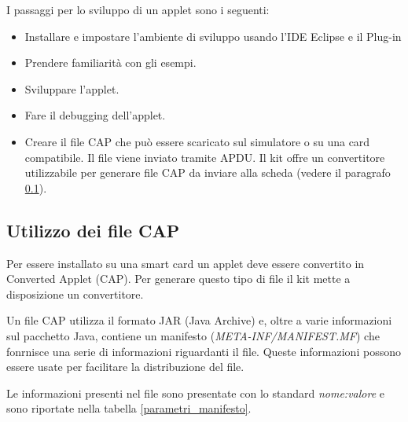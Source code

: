 I passaggi per lo sviluppo di un applet sono i seguenti:
\begin{itemize}
    \item Installare e impostare l'ambiente di sviluppo usando l'IDE Eclipse e il Plug-in
    \item Prendere familiarità con gli esempi.
    \item Sviluppare l'applet.
    \item Fare il debugging dell'applet.
    \item Creare il file CAP che può essere scaricato sul simulatore o su una card compatibile. Il file viene inviato tramite APDU. Il kit offre un convertitore utilizzabile per generare file CAP da inviare alla scheda (vedere il paragrafo \ref{cap}).
\end{itemize}

\subsection{Utilizzo dei file CAP}
\label{cap}
Per essere installato su una smart card un applet deve essere convertito in Converted Applet (CAP). Per generare questo tipo di file il kit mette a disposizione un convertitore.


Un file CAP utilizza il formato JAR (Java Archive) e, oltre a varie informazioni sul pacchetto Java, contiene un manifesto (\textit{META-INF/MANIFEST.MF}) che fonrnisce una serie di informazioni riguardanti il file. Queste informazioni possono essere usate per facilitare la distribuzione del file.

Le informazioni presenti nel file sono presentate con lo standard \textit{nome:valore} e sono riportate nella tabella \ref{parametri_manifesto}.

